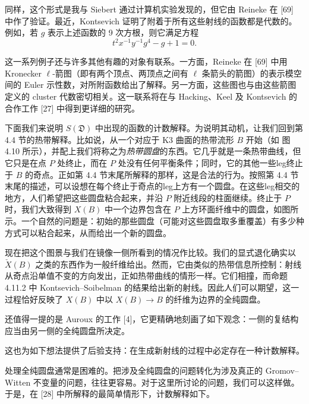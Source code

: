 同样，这个形式是我与 Siebert 通过计算机实验发现的，但它由 Reineke 在 [69] 中作了验证。最近，Kontsevich 证明了附着于所有这些射线的函数都是代数的。例如，若 $g$ 表示上述函数的 9 次方根，则它满足方程
\[
t^{2}x^{-1}y^{-1}g^{4}-g+1=0.
\]

这一系列例子还与许多其他有趣的对象有联系。一方面，Reineke 在 [69] 中用 Kronecker $\ell$-箭图（即有两个顶点、两顶点之间有 $\ell$ 条箭头的箭图）的表示模空间的 Euler 示性数，对所附函数给出了解释。另一方面，这些图也与由这些箭图定义的 cluster 代数密切相关。这一联系将在与 Hacking、Keel 及 Kontsevich 的合作工作 [27] 中得到更详细的研究。

下面我们来说明 $S(\mathfrak{D})$ 中出现的函数的计数解释。为说明其动机，让我们回到第 4.4 节的热带解释。比如说，从一个对应于 K3 曲面的热带流形 $B$ 开始（如 图 4.10 所示），并配上我们将称之为\emph{热带圆盘}的东西。它几乎就是一条热带曲线，但它只是在点 $P$ 处终止，而在 $P$ 处没有任何平衡条件；同时，它的其他一些leg终止于 $B$ 的奇点。正如第 4.4 节末尾所解释的那样，这是合法的行为。按照第 4.4 节末尾的描述，可以设想在每个终止于奇点的leg上方有一个圆盘。在这些leg相交的地方，人们希望把这些圆盘粘合起来，并沿 $P$ 附近线段的柱面继续。终止于 $P$ 时，我们大致得到 $X(B)$ 中一个边界包含在 $P$ 上方环面纤维中的圆盘，如图所示。一个自然的问题是：初始的那些圆盘（可能对这些圆盘取多重覆盖）有多少种方式可以粘合起来，从而给出一个新的圆盘。

现在把这个图景与我们在镜像一侧所看到的情况作比较。我们的显式退化确实以 $\check X(B)$ 之类的东西作为一般纤维给出。然而，它由类似的热带信息所控制：射线从奇点沿单值不变的方向发出，正如热带曲线的情形一样。它们相撞，而命题 4.11.2 中 Kontsevich--Soibelman 的结果给出新的射线。因此人们可以期望，这一过程恰好反映了 $X(B)$ 中以 $X(B)\to B$ 的纤维为边界的全纯圆盘。

还值得一提的是 Auroux 的工作 [4]，它更精确地刻画了如下观念：一侧的复结构应当由另一侧的全纯圆盘所决定。

这也为如下想法提供了后验支持：在生成新射线的过程中必定存在一种计数解释。

处理全纯圆盘通常是困难的。把涉及全纯圆盘的问题转化为涉及真正的 Gromov--Witten 不变量的问题，往往更容易。对于这里所讨论的问题，我们可以这样做。于是，在 [28] 中所解释的最简单情形下，计数解释如下。


